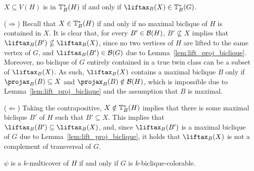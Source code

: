 \begin{theorem}
    \label{thm:lifted_transversal}
    $X \subseteq V(H)$ is in $\mathbb{T}^*_{B}(H)$ if and only if $\Lift{B}(X) \in \transs{B}(G)$.
\end{theorem}

\begin{tproof}
    ($\Rightarrow$) Recall that $X \in \mathbb{T}^*_{B}(H)$ if and only if no maximal biclique of $H$ is contained in $X$.
    It is clear that, for every $B' \in \mathcal{B}(H)$, $B' \nsubseteq X$ implies that $\Lift{B}(B') \nsubseteq \Lift{B}(X)$, since no two vertices of $H$ are lifted to the same vertex of $G$, and $\Lift{B}(B') \in \biq(G)$ due to Lemma~\ref{lem:lift_proj_biclique}.
    Moreover, no biclique of $G$ entirely contained in a true twin class can be a subset of $\Lift{B}(X)$. As such, $\Lift{B}(X)$ contains a maximal biclique $B$ only if $\Proj{B}(B) \subseteq X$ and $\Proj{B}(B) \notin \biq(H)$, which is impossible due to Lemma~\ref{lem:lift_proj_biclique} and the assumption that $B$ is maximal.
    
    ($\Leftarrow$) Taking the contrapositive, $X \notin \mathbb{T}^*_{B}(H)$ implies that there is some maximal biclique $B'$ of $H$ such that $B' \subseteq X$. This implies that $\Lift{B}(B') \subseteq \Lift{B}(X)$, and, since $\Lift{B}(B')$ is a maximal biclique of $G$ due to Lemma~\ref{lem:lift_proj_biclique}, it holds that $\Lift{B}(X)$ is not a complement of transversal of $G$.
\end{tproof}


\begin{theorem}
    \label{thm:lifted_multicover}
    $\psi$ is a $k$-multicover of $H$ if and only if $G$ is $k$-biclique-colorable.
\end{theorem}

